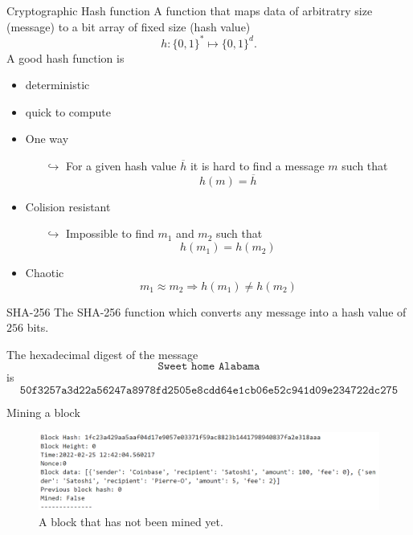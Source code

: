\documentclass{beamer}
\begin{document}
\begin{frame}{Cryptographic Hash function}
\small
A function that maps data of arbitratry size (message) to a bit array of fixed size (hash value)
$$
h:\{0,1\}^\ast\mapsto \{0,1\}^d. 
$$
A good hash function is
\begin{itemize}
\item deterministic
\item quick to compute
\item One way
\begin{itemize}
  \scriptsize
\item[$\hookrightarrow$] For a given hash value $\overline{h}$ it is hard to find a message $m$ such that 
$$
h(m) = \overline{h}
$$
\end{itemize}
\item Colision resistant 
\begin{itemize}
\item[$\hookrightarrow$] Impossible to find $m_1$ and $m_2$ such that 
$$
h(m_1) = h(m_2)
$$
\end{itemize}
\item Chaotic
$$m_1\approx m_2\Rightarrow  h(m_1) \neq h(m_2)$$
\end{itemize}
\end{frame}
\begin{frame}{SHA-256}
The SHA-256 function which converts any message into a hash value of $256$ bits.
\begin{tcolorbox}[enhanced,drop shadow, title=Example]
The hexadecimal digest of the message
$$
\texttt{Sweet home Alabama}
$$
is 
\footnotesize
$$
\texttt{50f3257a3d22a56247a8978fd2505e8cdd64e1cb06e52c941d09e234722dc275}
$$
\end{tcolorbox}
\end{frame}
\begin{frame}{Mining a block}
\begin{figure}[!ht]
    \includegraphics[width = \textwidth]{../../Figures/block_not_mined.png}
    \captionsetup{width=0.8\textwidth}
    \centering
    \caption{A block that has not been mined yet.}
    \label{fig:block_not_mined}
\end{figure}
\end{frame}
\end{document}

